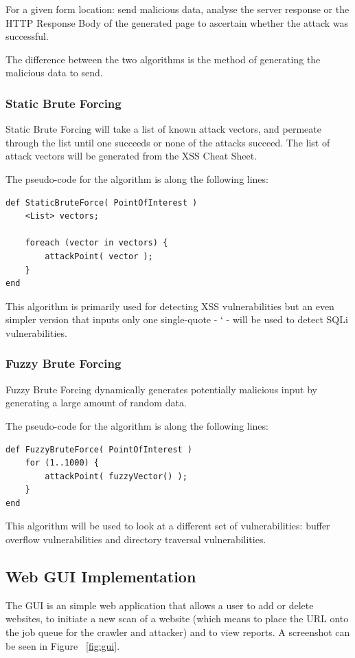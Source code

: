 \documentclass[12pt,a4paper]{article}
\begin{document}
For a given form location: send malicious data, analyse the server response or the HTTP Response Body of the generated page to ascertain whether the attack was successful.

The difference between the two algorithms is the method of generating the malicious data to send.

\subsubsection{Static Brute Forcing}
Static Brute Forcing will take a list of known attack vectors, and permeate through the list until one succeeds or none of the attacks succeed.  The list of attack vectors will be generated from the XSS Cheat Sheet.

The pseudo-code for the algorithm is along the following lines:

\begin{lstlisting}
def StaticBruteForce( PointOfInterest )     
    <List> vectors;
    
    foreach (vector in vectors) { 
        attackPoint( vector );
    }
end
\end{lstlisting}

This algorithm is primarily used for detecting XSS vulnerabilities but an even simpler version that inputs only one single-quote - ‘ - will be used to detect SQLi vulnerabilities.

\subsubsection{Fuzzy Brute Forcing}
Fuzzy Brute Forcing dynamically generates potentially malicious input by generating a large amount of random data.

The pseudo-code for the algorithm is along the following lines:

\begin{lstlisting} 
def FuzzyBruteForce( PointOfInterest )
	for (1..1000) { 		
	    attackPoint( fuzzyVector() ); 	
	}
end
\end{lstlisting}
This algorithm will be used to look at a different set of vulnerabilities: buffer overflow vulnerabilities and directory traversal vulnerabilities.

\subsection{Web GUI Implementation}
The GUI is an simple web application that allows a user to add or delete websites, to initiate a new scan of a website (which means to place the URL onto the job queue for the crawler and attacker) and to view reports.  A screenshot can be seen in Figure ~\ref{fig:gui}.
\end{document}
